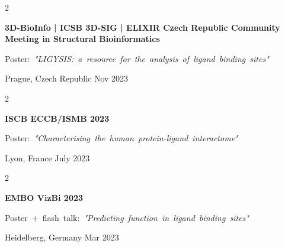 \documentclass[10pt, letterpaper]{article}
\newenvironment{twocolentry}[2][]{
    \onecolentry
    \def\secondColumn{#2}
    \setcolumnwidth{\fill, 4.5 cm}
    \begin{paracol}{2}
}{
    \switchcolumn \raggedleft \secondColumn
    \end{paracol}
    \endonecolentry
} %
\begin{document}
        \vspace{0.2 cm}

        \begin{samepage}
            \begin{twocolentry}{
                Nov 2023
            }
                \textbf{3D-BioInfo | ICSB 3D-SIG | ELIXIR Czech Republic Community Meeting in Structural Bioinformatics}

                \vspace{0.10 cm}

                \mbox{Poster: \textit{"LIGYSIS: a resource for the analysis of ligand binding sites"}}
                \vspace{0.10 cm}

        Prague, Czech Republic    \end{twocolentry}
        \end{samepage}

        \vspace{0.2 cm}

        \begin{samepage}
            \begin{twocolentry}{
                July 2023
            }
                \textbf{ISCB ECCB/ISMB 2023}

                \vspace{0.10 cm}

                \mbox{Poster: \textit{"Characterising the human protein-ligand interactome"}}
                \vspace{0.10 cm}

        Lyon, France    \end{twocolentry}
        \end{samepage}

        \vspace{0.2 cm}

        \begin{samepage}
            \begin{twocolentry}{
                Mar 2023
            }
                \textbf{EMBO VizBi 2023}

                \vspace{0.10 cm}

                \mbox{Poster + flash talk: \textit{"Predicting function in ligand binding sites"}}
                \vspace{0.10 cm}

        Heidelberg, Germany    \end{twocolentry}
        \end{samepage}
\end{document}
